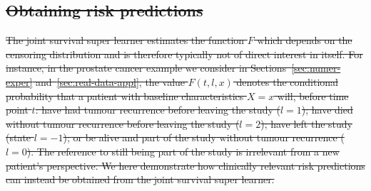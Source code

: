 \documentclass[lineno]{biometrika}
\newcommand{\1}{\mathds{1}}
\providecommand{\DIFdel}[1]{{\protect\color{red}\sout{#1}}}                      %
\providecommand{\DIFdelbegin}{} %
\providecommand{\DIFdelend}{} %
\begin{document}
\DIFdelbegin \subsection{\DIFdel{Obtaining risk predictions}}
\addtocounter{subsection}{-1}%

\DIFdel{The joint survival super learner estimates the function \( F \) which
depends on the censoring distribution and is therefore typically not
of direct interest in itself. For instance, in the prostate cancer
example we consider in Sections~\ref{sec:numer-exper}
and~\ref{sec:real-data-appl}, the value \( F(t, l, x) \) denotes the
conditional probability that a patient with baseline characteristics
\( X=x \) will, before time point \( t \):
have had tumour recurrence
before leaving the study ($l=1$); have died without tumour recurrence
before leaving the study ($l=2$); have left the study (state $l=-1$);
or be alive and part of the study without tumour recurrence ($l=0$).
The reference to still being part of the study is irrelevant from a
new patient's perspective. We here demonstrate how clinically relevant
risk predictions can instead be obtained from the joint survival super
learner.
}\DIFdelend %
\end{document}
